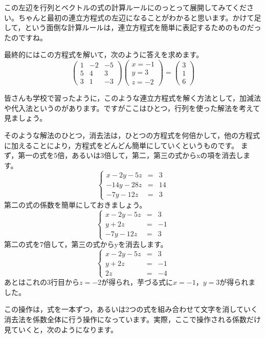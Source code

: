 \documentclass{ltjsbook}
\begin{document}
この左辺を行列とベクトルの式の計算ルールにのっとって展開してみてください。ちゃんと最初の連立方程式の左辺になることがわかると思います。かけて足して，という面倒な計算ルールは，連立方程式を簡単に表記するためのものだったのですね。

最終的にはこの方程式を解いて，次のように答えを求めます。
\[
	\begin{pmatrix} 1 & -2 & -5 \\
                5 & 4  & 3  \\
                3 & 1  & -3\end{pmatrix}
	\begin{pmatrix} x=-1 \\ y=3 \\ z=-2 \end{pmatrix}
	=
	\begin{pmatrix} 3 \\ 1 \\ 6 \end{pmatrix}
\]


皆さんも学校で習ったように，このような連立方程式を解く方法として，加減法や代入法というのがあります。ですがここはひとつ，行列を使った解法を考えて見ましょう。

そのような解法のひとつ，消去法は，ひとつの方程式を何倍かして，他の方程式に加えることにより，方程式をどんどん簡単にしていくというものです。
まず，第一の式を5倍，あるいは3倍して，第二，第三の式からxの項を消去します。
\[ \left \{
	\begin{array}{rcl}
		x-2y-5z  & = & 3  \\
		-14y-28z & = & 14 \\
		-7y-12z  & = & 3
	\end{array}
	\right .
\]
第二の式の係数を簡単にしておきましょう。
\[ \left \{
	\begin{array}{rcl}
		x-2y-5z & = & 3  \\
		y+2z    & = & -1 \\
		-7y-12z & = & 3
	\end{array}
	\right .
\]
第二の式を7倍して，第三の式からyを消去します。
\[ \left \{
	\begin{array}{rcl}
		x-2y-5z & = & 3  \\
		y+2z    & = & -1 \\
		2z      & = & -4
	\end{array}
	\right .
\]
あとはこれの3行目から$z=-2$が得られ，芋づる式に$x=-1$，$y=3$が得られました。


この操作は，式を一本ずつ，あるいは2つの式を組み合わせて文字を消していく消去法を係数全体に行う操作になっています。実際，ここで操作される係数だけ見ていくと，次のようになります。
\end{document}
